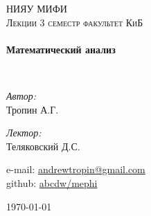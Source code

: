 \begin{titlepage}
  \begin{center}


    \textsc{\LARGE НИЯУ МИФИ}\\[1.5cm]

    \textsc{\Large Лекции 3 семестр факультет КиБ}\\[0.5cm]

    \HRule \\[0.4cm]
    {\huge \bfseries Математический анализ\\[0.4cm]}

    \HRule \\[1.5cm]

    \begin{minipage}{0.4\textwidth}
      \begin{flushleft} \large
        \emph{Автор:}\\
        Тропин \textsc{А.Г.}
      \end{flushleft}
    \end{minipage}
    \begin{minipage}{0.4\textwidth}
      \begin{flushright} \large
        \emph{Лектор:} \\
        Теляковский \textsc{Д.С.}
      \end{flushright}
    \end{minipage}

    \vfill
    \begin{flushleft}
      e-mail: \href{mailto:andrewtropin@gmail.com}{andrewtropin@gmail.com} \\
      github: \href{http://github.com/abcdw/mephi}{abcdw/mephi}
    \end{flushleft}
    {\large \today}
  \end{center}
\end{titlepage}
